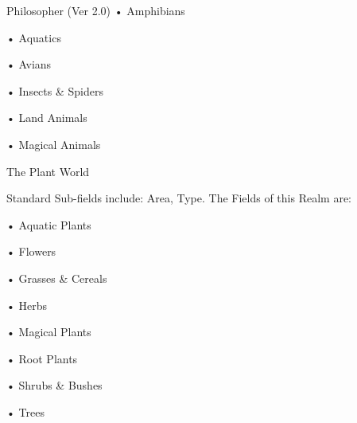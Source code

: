 \begin{Chapter}{Philosopher (Ver 2.0)}
• Amphibians  

• Aquatics  

• Avians  

• Insects \& Spiders  

• Land Animals  

• Magical Animals 

The Plant World 

Standard  Sub-fields  include:  Area,  Type.  The 
Fields of this Realm are:  

• Aquatic Plants  

• Flowers  

• Grasses \& Cereals  

• Herbs  

• Magical Plants  

• Root Plants  

• Shrubs \& Bushes  

• Trees 

\end{Chapter}
